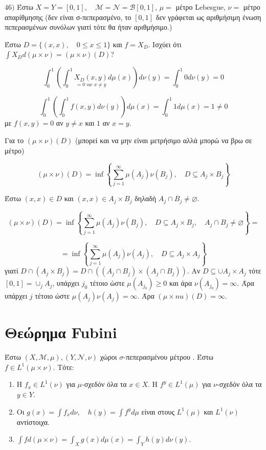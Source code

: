 $46)$ Έστω $ X = Y  = [0,1], \quad \mathcal M = \mathcal N = \mathcal B [0,1]$, $\mu = $ μέτρο Lebesgue, $\nu =$ μέτρο απαρίθμησης (δεν είναι σ-πεπερασμένο, το $[0,1]$ δεν γράφεται ως αριθμήσιμη ένωση πεπερασμένων συνόλων γιατί τότε θα ήταν αριθμήσιμο.)


Έστω $D = \{(x,x), \quad 0\leq x \leq 1\}$ και $f = X_D$. Ισχύει ότι $\int X_D d(\mu \times \nu) = (\mu \times \nu) (D)$?

$$\int_{0}^1 \left( \int_{0}^1 \underset{ = 0 \textrm{ αν } x\neq y }{X_D (x,y)} d\mu(x) \right) d\nu(y) = \int _0^1 0 d\nu(y) = 0$$

$$\int_{0}^1 \left( \int _0^1 f(x,y) d\nu(y)\right) d\mu(x) = \int_0^1 1 d\mu(x) = 1 \neq 0$$ με $f(x,y) = 0$ αν $y\neq x$ και $1$ αν $x=y$.


Για το $(\mu \times \nu)(D)$ (μπορεί και να μην είναι μετρήσιμο αλλά μπορώ να βρω σε μέτρο)

$$(\mu \times \nu)(D) = \inf \left\{ \sum_{j=1}^{\infty} \mu (A_j) \nu (B_j), \quad D\subseteq A_j \times B_j \right\}$$


Έστω $(x,x) \in D$ και $(x,x) \in A_j \times B_j$ δηλαδή $A_j \cap B_j \neq \varnothing$.

$$(\mu \times \nu) (D) = \inf \left\{ \sum_{j=1}^{\infty} \mu (A_j) \nu (B_j), \quad D\subseteq A_j \times B_j, \quad A_j \cap B_j \neq \varnothing \right\} = $$

$$ = \inf \left\{ \sum_{j=1}^{\infty} \mu(A_j) \nu(A_j), \quad D\subseteq A_j \times A_j \right\}$$ γιατί $D\cap ( A_j \times B_j) = D\cap \left( (A_j \cap B_j) \times (A_j \cap B_j) \right)$. Αν $D \subseteq \cup A_j \times A_j$ τότε $[0,1] = \cup_j A_j$, υπάρχει $j_0$ τέτοιο ώστε $\mu (A_{j_0}) \geq 0$ και άρα $\nu (A_{j_0}) = \infty$. Άρα υπάρχει $j$ τέτοιο ώστε $\mu(A_j) \nu(A_j) =\infty$. Άρα $(\mu \times nu)(D) = \infty$.

\pagebreak
\section{Θεώρημα  Fubini}

\begin{theorem} Έστω $(X, \mathcal M, \mu), (Y,\mathcal N, \nu)$ χώροι $\sigma$-πεπερασμένου μέτρου . Έστω $f \in L^1 (\mu \times \nu)$. Τότε:
    \begin{enumerate}
    \item Η $f_x \in L^1(\nu)$ για $\mu$-σχεδόν όλα τα $x \in X$. Η $f^y \in L^1(\mu)$ για $\nu$-σχεδόν όλα τα $y \in Y$.

    \item Οι $g(x) = \int f_x d\nu, \quad h(y) = \int f^y d\mu$ είναι στους $L^1(\mu)$ και $L^1(\nu)$ αντίστοιχα.

    \item $\int f d(\mu \times \nu) = \int_X g(x) d\mu(x) = \int_Y h(y) d\nu(y)$.
    \end{enumerate}
\end{theorem}


